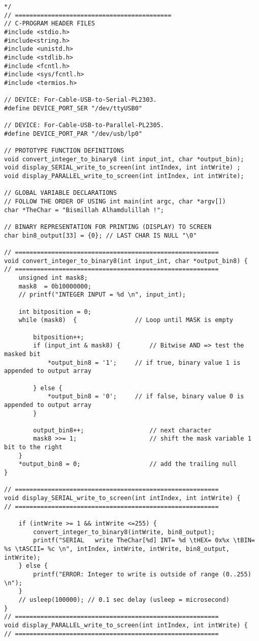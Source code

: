 \begin{lstlisting}[caption={App4-Concurrent Writes to Parallel and Serial Ports}, label=App4-Concurrent Writes to Parallel and Serial Ports]
*/
// ===========================================
// C-PROGRAM HEADER FILES
#include <stdio.h>
#include<string.h>
#include <unistd.h>
#include <stdlib.h>
#include <fcntl.h>
#include <sys/fcntl.h>
#include <termios.h>

// DEVICE: For-Cable-USB-to-Serial-PL2303.
#define DEVICE_PORT_SER	"/dev/ttyUSB0"

// DEVICE: For-Cable-USB-to-Parallel-PL2305.
#define DEVICE_PORT_PAR	"/dev/usb/lp0"

// PROTOTYPE FUNCTION DEFINITIONS
void convert_integer_to_binary8 (int input_int, char *output_bin);
void display_SERIAL_write_to_screen(int intIndex, int intWrite) ;
void display_PARALLEL_write_to_screen(int intIndex, int intWrite); 

// GLOBAL VARIABLE DECLARATIONS
// FOLLOW THE ORDER OF USING int main(int argc, char *argv[])
char *TheChar = "Bismillah Alhamdulillah !";

// BINARY REPRESENTATION FOR PRINTING (DISPLAY) TO SCREEN
char bin8_output[33] = {0};	// LAST CHAR IS NULL "\0"

// ========================================================
void convert_integer_to_binary8(int input_int, char *output_bin8) {
// ========================================================
	unsigned int mask8;
	mask8  = 0b10000000; 
	// printf("INTEGER INPUT = %d \n", input_int);

	int bitposition = 0;    
	while (mask8)  {         		// Loop until MASK is empty

		bitposition++;
		if (input_int & mask8) {     	// Bitwise AND => test the masked bit
			*output_bin8 = '1';     // if true, binary value 1 is appended to output array

		} else {
			*output_bin8 = '0';     // if false, binary value 0 is appended to output array
		}

		output_bin8++;                	// next character
		mask8 >>= 1;                 	// shift the mask variable 1 bit to the right
	}
	*output_bin8 = 0;                 	// add the trailing null 
}

// ========================================================
void display_SERIAL_write_to_screen(int intIndex, int intWrite) {
// ========================================================

	if (intWrite >= 1 && intWrite <=255) {
		convert_integer_to_binary8(intWrite, bin8_output);	
		printf("SERIAL   write TheChar[%d] INT= %d \tHEX= 0x%x \tBIN= %s \tASCII= %c \n", intIndex, intWrite, intWrite, bin8_output, intWrite);
	} else {
		printf("ERROR: Integer to write is outside of range (0..255) \n"); 	
	}
	// usleep(100000); // 0.1 sec delay (usleep = microsecond)
}
// ========================================================
void display_PARALLEL_write_to_screen(int intIndex, int intWrite) {
// ========================================================


\end{lstlisting}
